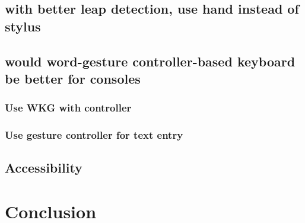\subsection{with better leap detection, use hand instead of stylus}

\subsection{would word-gesture controller-based keyboard be better for consoles}

\subsubsection{Use WKG with controller}

\subsubsection{Use gesture controller for text entry}

\subsection{Accessibility}

\section {Conclusion}